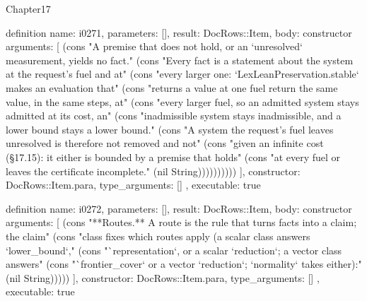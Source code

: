 \begin{lexlean}{Chapter17}
\begin{semanticmodule}
definition{
  name: i0271,
  parameters: [],
  result: DocRows::Item,
  body: constructor{
    arguments: [
      (cons "A premise that does not hold, or an `unresolved` measurement, yields no fact." (cons "Every fact is a statement about the system at the request's fuel and at" (cons "every larger one: `LexLeanPreservation.stable` makes an evaluation that" (cons "returns a value at one fuel return the same value, in the same steps, at" (cons "every larger fuel, so an admitted system stays admitted at its cost, an" (cons "inadmissible system stays inadmissible, and a lower bound stays a lower bound." (cons "A system the request's fuel leaves unresolved is therefore not removed and not" (cons "given an infinite cost (§17.15): it either is bounded by a premise that holds" (cons "at every fuel or leaves the certificate incomplete." (nil String))))))))))
    ],
    constructor: DocRows::Item.para,
    type_arguments: []
  },
  executable: true
}

definition{
  name: i0272,
  parameters: [],
  result: DocRows::Item,
  body: constructor{
    arguments: [
      (cons "**Routes.** A route is the rule that turns facts into a claim; the claim" (cons "class fixes which routes apply (a scalar class answers `lower_bound`," (cons "`representation`, or a scalar `reduction`; a vector class answers" (cons "`frontier_cover` or a vector `reduction`; `normality` takes either):" (nil String)))))
    ],
    constructor: DocRows::Item.para,
    type_arguments: []
  },
  executable: true
}


\end{semanticmodule}
\end{lexlean}
